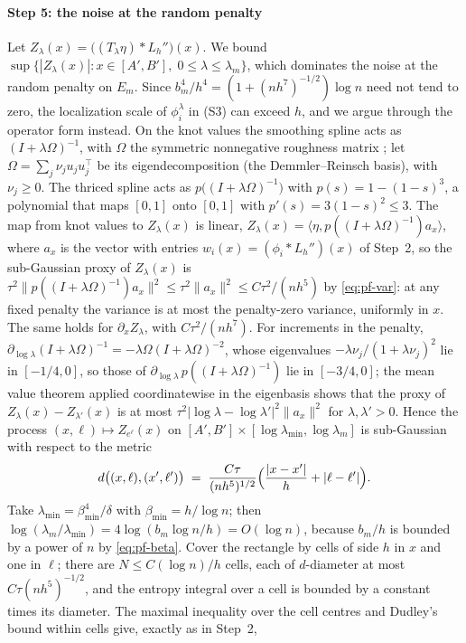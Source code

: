 \documentclass[preprint,12pt,authoryear,times]{elsarticle}
\begin{document}
\paragraph{Step 5: the noise at the random penalty}
Let \(Z_\lambda(x)=\bigl((T_\lambda\eta)\ast L_h''\bigr)(x)\). We bound \(\sup\{|Z_\lambda(x)|:x\in[A',B'],\;0\le\lambda\le\lambda_m\}\), which dominates the noise at the random penalty on \(E_m\). Since \(b_m^4/h^4=(1+(nh^7)^{-1/2})\log n\) need not tend to zero, the localization scale of \(\phi_i^\lambda\) in (S3) can exceed \(h\), and we argue through the operator form instead. On the knot values the smoothing spline acts as \((I+\lambda\Omega)^{-1}\), with \(\Omega\) the symmetric nonnegative roughness matrix \citep{green1994}; let \(\Omega=\sum_j\nu_ju_ju_j^\top\) be its eigendecomposition (the Demmler--Reinsch basis), with \(\nu_j\ge 0\). The thriced spline acts as \(p\bigl((I+\lambda\Omega)^{-1}\bigr)\) with \(p(s)=1-(1-s)^3\), a polynomial that maps \([0,1]\) onto \([0,1]\) with \(p'(s)=3(1-s)^2\le 3\). The map from knot values to \(Z_\lambda(x)\) is linear, \(Z_\lambda(x)=\langle\eta,p((I+\lambda\Omega)^{-1})a_x\rangle\), where \(a_x\) is the vector with entries \(w_i(x)=(\phi_i\ast L_h'')(x)\) of Step~2, so the sub-Gaussian proxy of \(Z_\lambda(x)\) is \(\tau^2\|p((I+\lambda\Omega)^{-1})a_x\|^2\le\tau^2\|a_x\|^2\le C\tau^2/(nh^5)\) by \eqref{eq:pf-var}: at any fixed penalty the variance is at most the penalty-zero variance, uniformly in \(x\). The same holds for \(\partial_xZ_\lambda\), with \(C\tau^2/(nh^7)\). For increments in the penalty, \(\partial_{\log\lambda}(I+\lambda\Omega)^{-1}=-\lambda\Omega(I+\lambda\Omega)^{-2}\), whose eigenvalues \(-\lambda\nu_j/(1+\lambda\nu_j)^2\) lie in \([-1/4,0]\), so those of \(\partial_{\log\lambda}\,p((I+\lambda\Omega)^{-1})\) lie in \([-3/4,0]\); the mean value theorem applied coordinatewise in the eigenbasis shows that the proxy of \(Z_\lambda(x)-Z_{\lambda'}(x)\) is at most \(\tau^2|\log\lambda-\log\lambda'|^2\|a_x\|^2\) for \(\lambda,\lambda'>0\). Hence the process \((x,\ell)\mapsto Z_{e^\ell}(x)\) on \([A',B']\times[\log\lambda_{\min},\log\lambda_m]\) is sub-Gaussian with respect to the metric
\[
d\bigl((x,\ell),(x',\ell')\bigr)\;=\;\frac{C\tau}{(nh^5)^{1/2}}\Bigl(\frac{|x-x'|}{h}+|\ell-\ell'|\Bigr).
\]
Take \(\lambda_{\min}=\beta_{\min}^4/\delta\) with \(\beta_{\min}=h/\log n\); then \(\log(\lambda_m/\lambda_{\min})=4\log(b_m\log n/h)=O(\log n)\), because \(b_m/h\) is bounded by a power of \(n\) by \eqref{eq:pf-beta}. Cover the rectangle by cells of side \(h\) in \(x\) and one in \(\ell\); there are \(N\le C(\log n)/h\) cells, each of \(d\)-diameter at most \(C\tau(nh^5)^{-1/2}\), and the entropy integral over a cell is bounded by a constant times its diameter. The maximal inequality over the cell centres and Dudley's bound within cells give, exactly as in Step~2,
\end{document}
